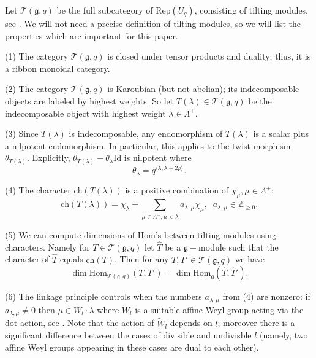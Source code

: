 \documentclass{amsart}
\theoremstyle{definition}
\newcommand{\Z}{\mathbb{Z}}
\newcommand{\g}{\mathfrak{g}}
\newcommand{\T}{\mathcal{T}}
\newcommand{\Rep}{\text{Rep}}
\newcommand{\Id}{\text{Id}}
\newcommand{\Hom}{\mathrm{Hom}}
\numberwithin{equation}{section}
\begin{document}
Let $\T(\g,q)$ be the full subcategory of $\Rep(U_q)$, consisting of tilting modules, see \cite[3.18]{AP}. We will not need a precise definition
of tilting modules, so we will list the properties which are important for this paper.

(1) The category $\T(\g,q)$ is closed under tensor products and duality; thus, it is a ribbon monoidal category.

(2) The category $\T(\g,q)$ is Karoubian (but not abelian); its indecomposable objects are labeled by
highest weights. So let $T(\lambda)\in \T(\g,q)$ be the indecomposable object with highest weight $\lambda \in \Lambda^+$.

(3) Since $T(\lambda)$ is indecomposable, any endomorphism of $T(\lambda)$  is a scalar plus a nilpotent endomorphism. In particular, this applies to the twist morphism $\theta_{T(\lambda)}$. Explicitly, 
$\theta_{T(\lambda)}-\theta_\lambda \Id$ is nilpotent where
$$\theta_\lambda =q^{\langle \lambda, \lambda +2\rho \rangle }.$$

(4) The character $\mbox{ch}(T(\lambda))$ is a positive combination of $\chi_\mu, \mu \in \Lambda^+$:
$$\mbox{ch}(T(\lambda))=\chi_\lambda +\sum_{\mu \in \Lambda^+, \mu < \lambda} a_{\lambda, \mu}\chi_\mu,
\; \; a_{\lambda, \mu}\in \Z_{\ge 0}.$$

(5) We can compute dimensions of Hom's between tilting modules using characters. Namely
for $T\in \T(\g,q)$ let $\hat T$ be a $\g-$module such that the character of $\hat T$ equals $\mbox{ch}(T)$.
Then for any $T, T' \in \T(\g,q)$ we have 
$$\dim \Hom_{\T(\g,q)}(T,T')=\dim \Hom_\g (\hat T, \hat T').$$

(6) The linkage principle controls when the numbers $a_{\lambda, \mu}$ from (4) are nonzero:
if $a_{\lambda, \mu}\ne 0$ then $\mu \in \tilde W_l\cdot \lambda$ where $\tilde W_l$ is a suitable
affine Weyl group acting via the dot-action, see \cite[3.17]{AP}. Note that the action of $\tilde W_l$ depends on $l$;
moreover there is a significant difference between the cases of divisible and undivisble $l$ (namely, two affine
Weyl groups appearing in these cases are dual to each other).
\end{document}
